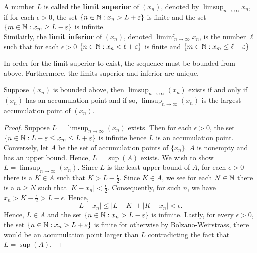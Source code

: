 \begin{definition}
	A number \(L\)	 is called the \textbf{limit superior} of \(\left( x_{n} \right) \), denoted by \(\limsup_{n \to \infty}x_{n}\), if for each \(\epsilon > 0\), the set \(\{n \in \mathbb{N} : x_{n} > L + \varepsilon\} \) is finite and the set \(\{m \in \mathbb{N} : x_{m} \ge L - \varepsilon\} \) is infinite.\\
	Similairly, the \textbf{limit inferior} of \(\left( x_{n} \right) \), denoted \(\liminf _{n \to \infty} x_{n}\), is the number \(\ell\) such that for each \(\epsilon > 0\) \(\{n \in \mathbb{N} : x_{n} < \ell + \varepsilon\} \) is finite and \(\{m \in \mathbb{N} : x_{m} \le \ell + \varepsilon\} \)
\end{definition}
\begin{remark}
	In order for the limit superior to exist, the sequence must be bounded from above. Furthermore, the limits superior and inferior are unique.
\end{remark}
\begin{proposition}
	Suppose \(\left( x_{n} \right) \) is bounded above, then \(\limsup_{n \to \infty} \left( x_{n} \right) \) exists if and only if \(\left( x_{n} \right) \) has an accumulation point and if so, \(\limsup_{n \to \infty}\left( x_{n} \right) \) is the largest accumulation point of \(\left( x_{n} \right) \).
\end{proposition}
\begin{proof}
	Suppose \(L = \limsup_{n \to \infty}\left( x_{n} \right) \) exists. Then for each \(\epsilon > 0\), the set \(\{{n} \in \mathbb{N} : L - \varepsilon \le x_{m} \le L + \varepsilon\} \) is infinite hence \(L\) is an accumulation point.\\
	Conversely, let \(A\) be the set of accumulation points of \(\{x_{n}\} \). \(A\) is nonempty and has an upper bound. Hence, \(L = \sup \left( A \right) \) exists. We wish to show \(L = \limsup_{n \to  \infty} \left( x_{n} \right) \). Since \(L\) is the least upper bound of \(A\), for each \(\epsilon > 0\) there is a \(K \in A\) such that \(K > L - \frac{\epsilon}{2}\). Since \(K \in A\), we see for each \(N \in \mathbb{N}\) there is a \(n \ge N\) such that \(\left| K - x_{n} \right|  < \frac{\epsilon}{2}\). Consequently, for such \(n\), we have \(x_{n} > K - \frac{\epsilon}{2} > L - \epsilon\). Hence, \[
	\left| L - x_{n} \right| \le \left| L - K \right|  + \left| K - x_{n} \right| < \epsilon
	.\]
	Hence, \(L \in A\) and the set \(\{n \in \mathbb{N} :  x_{n} > L  - \varepsilon\} \) is infinite. Lastly, for every \(\epsilon > 0\), the set \(\{n \in \mathbb{N} : x_{n} > L + \varepsilon\} \) is finite for otherwise by Bolzano-Weirstrass, there would be an accumulation point larger than \(L\) contradicting the fact that \(L = \sup \left( A \right) \).
\end{proof}
